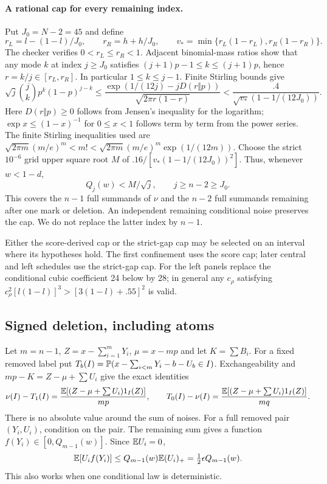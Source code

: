 \paragraph{A rational cap for every remaining index.}
Put $J_0=N-2=45$ and define
\[
 r_L=l-(1-l)/J_0,\qquad r_R=h+h/J_0,\qquad
 v_* =\min\{r_L(1-r_L),r_R(1-r_R)\}.
\]
The checker verifies $0<r_L\le r_R<1$. Adjacent binomial-mass ratios
show that any mode $k$ at index $j\ge J_0$ satisfies
$(j+1)p-1\le k\le(j+1)p$, hence $r=k/j\in[r_L,r_R]$.
In particular $1\le k\le j-1$. Finite Stirling bounds give
\[
 \sqrt j\binom jk p^k(1-p)^{j-k}
 \le\frac{\exp(1/(12j)-jD(r\Vert p))}{\sqrt{2\pi r(1-r)}}
 <\frac{.4}{\sqrt{v_*}(1-1/(12J_0))}.
\]
Here $D(r\Vert p)\ge0$ follows from Jensen's inequality for the logarithm;
$\exp x\le(1-x)^{-1}$ for $0\le x<1$ follows term by term from the
power series. The finite Stirling inequalities used are
$\sqrt{2\pi m}(m/e)^m<m!<\sqrt{2\pi m}(m/e)^m\exp(1/(12m))$.
Choose the strict $10^{-6}$ grid upper square root $M$ of
$.16/[v_*(1-1/(12J_0))^2]$. Thus, whenever $w<1-d$,
\begin{equation}\label{conf:antichainconcentration}
 Q_j(w)<M/\sqrt j,\qquad j\ge n-2\ge J_0.
\end{equation}
This covers the $n-1$ full summands of $\nu$ and the $n-2$ full summands
remaining after one mark or deletion. An independent remaining conditional
noise preserves the cap. We do not replace the latter index by $n-1$.


Either the score-derived cap or the strict-gap cap may be selected on
an interval where its hypotheses hold. The first confinement uses the
score cap; later central and left schedules use the strict-gap cap.
For the left panels replace the conditional cubic coefficient 24 below
by 28; in general any $c_\rho$ satisfying
$c_\rho^2[l(1-l)]^3>[3(1-l)+.55]^2$ is valid.
\subsection{Signed deletion, including atoms}
Let $m=n-1$, $Z=x-\sum_{i=1}^mY_i$, $\mu=x-mp$ and let $K=\sum B_i$.
For a fixed removed label put
$T_b(I)=\mathbb P(x-\sum_{i<m}Y_i-b-U_b\in I)$.
Exchangeability and $mp-K=Z-\mu+\sum U_i$ give the exact identities
\[
 \nu(I)-T_1(I)=\frac{\mathbb E[(Z-\mu+\sum U_i)1_I(Z)]}{mp},\qquad
 T_0(I)-\nu(I)=\frac{\mathbb E[(Z-\mu+\sum U_i)1_I(Z)]}{mq}.
\]
There is no absolute value around the sum of noises.
For a full removed pair $(Y_i,U_i)$, condition on the pair. The remaining
sum gives a function $f(Y_i)\in[0,Q_{m-1}(w)]$. Since $\mathbb E U_i=0$,
\[
 \mathbb E[U_i f(Y_i)]\le Q_{m-1}(w)\mathbb E(U_i)_+
 =\tfrac12\epsilon Q_{m-1}(w).
\]
This also works when one conditional law is deterministic.


